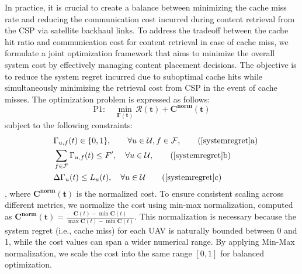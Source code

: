 \documentclass[journal]{IEEEtran}
\begin{document}
In practice, it is crucial to create a balance between minimizing the cache miss rate and reducing the communication cost incurred during content retrieval from the CSP via satellite backhaul links. To address the tradeoff between the cache hit ratio and communication cost for content retrieval in case of cache miss, we formulate a joint optimization framework that aims to minimize the overall system cost by effectively managing content placement decisions. The objective is to reduce the system regret incurred due to suboptimal cache hits while simultaneously minimizing the retrieval cost from CSP in the event of cache misses. The optimization problem is expressed as follows: 
\begin{equation}
    \text{P$1$}:\quad \min_{\boldsymbol{\Gamma(t)}} \boldsymbol{\mathcal{R}(t)} +\boldsymbol{{C}^{\text{norm}}(t)} \label{systemregret}
\end{equation}
subject to the following constraints:
\begin{align}
    & \quad \Gamma_{u,f}(t) \in \{0,1\}, \quad \quad\forall u\in \mathcal{U}, f \in \mathcal{F}, \tag{\ref{systemregret}a} \label{systemregretC1} \\
    & \quad \sum_{f \in \mathcal{F}} \Gamma_{u,f}(t) \leq F', \quad \forall u \in \mathcal{U}, \tag{\ref{systemregret}b} \label{systemregretC2} \\
    & \quad \Delta{\Gamma_{u}(t)} \leq L_u(t) , \quad \forall u \in \mathcal{U}   \tag{\ref{systemregret}c} \label{systemregretC3} 
\end{align}, where $\boldsymbol{{C}^{\text{norm}}(t)}$ is the normalized cost. To ensure consistent scaling across different metrics, we normalize the cost using min-max normalization, computed as \(
\boldsymbol{{C}^{\text{norm}}(t)} = \frac{\boldsymbol{C}(t) - \min \boldsymbol{C}(t)}{\max \boldsymbol{C}(t) - \min \boldsymbol{C}(t)}.
\label{eq:minmax_cost}
\) This normalization is necessary because the system regret (i.e., cache miss) for each UAV is naturally bounded between 0 and 1, while the cost values can span a wider numerical range. By applying Min-Max normalization, we scale the cost into the same range $[0, 1]$ for balanced optimization.
\end{document}
